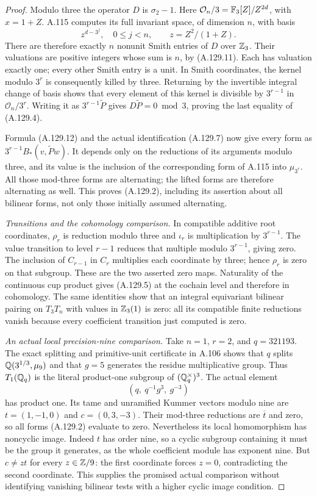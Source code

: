 \begin{proof}
Modulo three the operator \(D\) is \(\sigma_2-1\).
Here \(\mathcal O_n/3=\mathbb F_3[Z]/Z^{2d}\), with \(x=1+Z\).
A.115 computes its full invariant space, of dimension \(n\),
with basis
\[
        z^{d-3^j},\quad 0\le j<n,\qquad
                            z=Z^2/(1+Z).
 \tag{A.129.12}
\]
There are therefore exactly \(n\) nonunit Smith entries
of \(D\) over \(\mathbb Z_3\).  Their valuations are positive
integers whose sum is \(n\), by (A.129.11).
Each has valuation exactly one; every other Smith entry
is a unit.  In Smith coordinates, the kernel modulo
\(3^r\) is consequently killed by three.
Returning by the invertible integral change of basis
shows that every element of this kernel is divisible
by \(3^{r-1}\) in \(\mathcal O_n/3^r\).
Writing it as \(3^{r-1}\widetilde P\) gives
\(D\widetilde P=0\bmod3\), proving the last equality
of (A.129.4).

Formula (A.129.12) and the actual identification (A.129.7)
now give every form as
\(3^{r-1}B_*(v,\widetilde P w)\).
It depends only on the reductions of its arguments modulo
three, and its value is the inclusion of the corresponding
form of A.115 into \(\mu_{3^r}\).
All those mod-three forms are alternating; the lifted
forms are therefore alternating as well.
This proves (A.129.2), including its assertion about all
bilinear forms, not only those initially assumed alternating.

\emph{Transitions and the cohomology comparison.}
In compatible additive root coordinates, \(\rho_r\)
is reduction modulo three and \(\iota_r\) is multiplication
by \(3^{r-1}\).  The value transition to level \(r-1\)
reduces that multiple modulo \(3^{r-1}\), giving zero.
The inclusion of \(C_{r-1}\) in \(C_r\) multiplies
each coordinate by three; hence \(\rho_r\) is zero
on that subgroup.  These are the two asserted zero maps.
Naturality of the continuous cup product gives (A.129.5)
at the cochain level and therefore in cohomology.
The same identities show that an integral equivariant
bilinear pairing on \(T_3T_n\) with values in \(\mathbb Z_3(1)\)
is zero: all its compatible finite reductions vanish
because every coefficient transition just computed is zero.

\emph{An actual local precision-nine comparison.}
Take \(n=1\), \(r=2\), and \(q=321193\).
The exact splitting and primitive-unit certificate in A.106
shows that \(q\) splits \(\mathbb Q(3^{1/3},\mu_9)\) and
that \(g=5\) generates the residue multiplicative group.
Thus \(T_1(\mathbb Q_q)\) is the literal product-one subgroup
of \((\mathbb Q_q^\times)^3\).
The actual element
\[
                       (q,\ q^{-1}g^3,\ g^{-3})
 \tag{A.129.13}
\]
has product one.
Its tame and unramified Kummer vectors modulo nine are
\(t=(1,-1,0)\) and \(c=(0,3,-3)\).
Their mod-three reductions are \(\overline t\) and zero,
so all forms (A.129.2) evaluate to zero.
Nevertheless its local homomorphism has noncyclic image.
Indeed \(t\) has order nine, so a cyclic subgroup containing
it must be the group it generates, as the whole coefficient
module has exponent nine.  But \(c\ne zt\) for every
\(z\in\mathbb Z/9\): the first coordinate forces \(z=0\),
contradicting the second coordinate.
This supplies the promised actual comparison without
identifying vanishing bilinear tests with a higher cyclic
image condition.
\end{proof}

